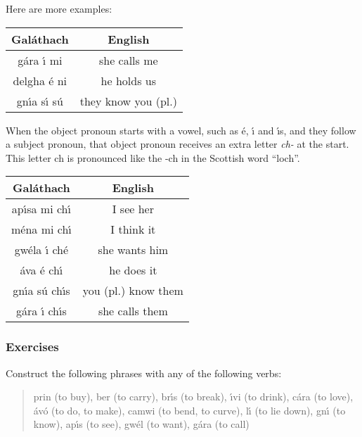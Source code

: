 Here are more examples:
\begin{table}[H]
\centering
\begin{tabu}{c|c}
  \textbf{Gal\'{a}thach} & \textbf{English}\\
  \toprule
   g\'{a}ra \'{\i} mi & she calls me\\
   delgha \'{e} ni & he holds us\\
   gn\'{\i}a s\'{\i} s\'{u} & they know you (pl.)
\end{tabu}
\label{examples_verbs_vso_more_examples}
\end{table}

When the object pronoun starts with a vowel, such as \'{e}, \'{\i} and \'{\i}s, and they follow a subject pronoun, that object pronoun receives an extra letter \textit{ch-} at the start. This letter ch is pronounced like the -ch in the Scottish word ``loch''.
\begin{table}[H]
\centering
\begin{tabu}{c|c}
  \textbf{Gal\'{a}thach} & \textbf{English}\\
  \toprule
  ap\'{\i}sa mi ch\'{\i} & I see her\\
  m\'{e}na mi ch\'{\i} & I think it\\
  gw\'{e}la \'{\i} ch\'{e} & she wants him\\
  \'{a}va \'{e} ch\'{\i} & he does it\\
  gn\'{\i}a s\'{u} ch\'{\i}s & you (pl.) know them\\
  g\'{a}ra \'{\i} ch\'{\i}s & she calls them
\end{tabu}
\label{examples_verbs_vso_extra_ch}
\end{table}

\subsubsection{Exercises}

Construct the following phrases with any of the following verbs:\\

\begin{quote}
prin (to buy), ber (to carry), br\'{\i}s (to break), \'{\i}vi (to drink), c\'{a}ra (to love), \'{a}v\'{o} (to do, to make), camwi (to bend, to curve), l\'{\i} (to lie down), gn\'{\i} (to know), ap\'{\i}s (to see), gw\'{e}l (to want), g\'{a}ra (to call)
\end{quote}

